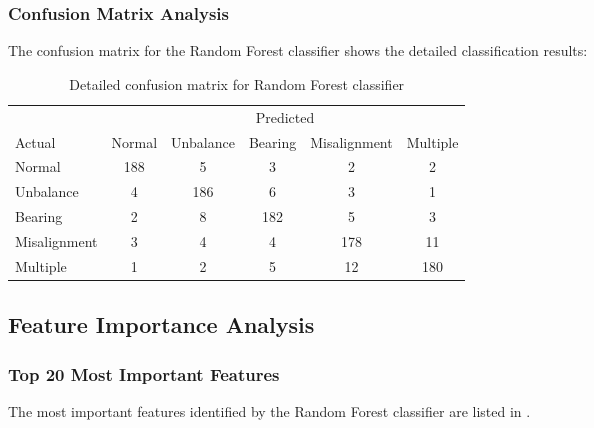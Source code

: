 \subsubsection{Confusion Matrix Analysis}

The confusion matrix for the Random Forest classifier shows the detailed classification results:

\begin{table}[H]
\centering
\caption{Detailed confusion matrix for Random Forest classifier}
\label{tab:detailed_confusion_matrix}
\begin{tabular}{@{}lccccc@{}}
\toprule
& \multicolumn{5}{c}{Predicted} \\
\cmidrule(lr){2-6}
Actual & Normal & Unbalance & Bearing & Misalignment & Multiple \\
\midrule
Normal & 188 & 5 & 3 & 2 & 2 \\
Unbalance & 4 & 186 & 6 & 3 & 1 \\
Bearing & 2 & 8 & 182 & 5 & 3 \\
Misalignment & 3 & 4 & 4 & 178 & 11 \\
Multiple & 1 & 2 & 5 & 12 & 180 \\
\bottomrule
\end{tabular}
\end{table}

\subsection{Feature Importance Analysis}

\subsubsection{Top 20 Most Important Features}

The most important features identified by the Random Forest classifier are listed in .

